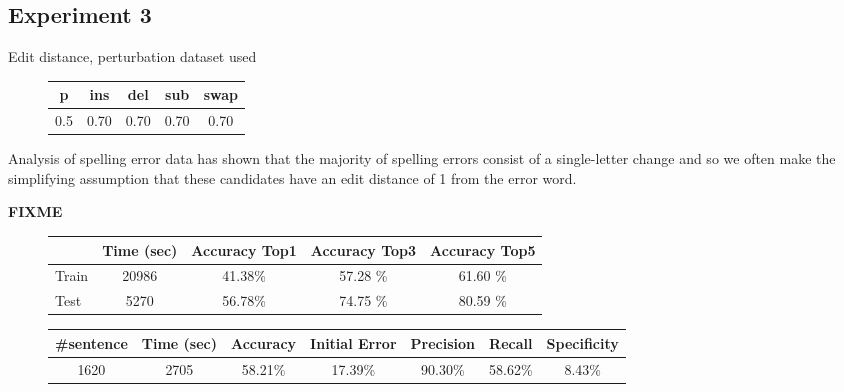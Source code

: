 \subsection{Experiment 3}

Edit distance, perturbation dataset used

\begin{figure}[H]
	\centering
	\begin{tabular}{ccccc}
		\toprule
		p 				 & ins 				 	& del  				&  sub 			   &   swap\\ \midrule
		\num{0.5} & \num{0,70} & \num{0,70}  & \num{0,70} & \num{0,70}\\
		\bottomrule
	\end{tabular}
	\label{tab:error_model3}
\end{figure}

Analysis of spelling error data has shown that the majority of spelling errors consist of a single-letter change and 
so we often make the simplifying assumption that these candidates have an edit distance of 1 from the error word.

\textbf{FIXME}
\begin{figure}[H]
	\centering
	\begin{tabular}{lcccc}
		\toprule
		& Time (sec)  & Accuracy Top1 & Accuracy Top3  &  Accuracy Top5 \\
		\midrule
		Train & \num{20986} & \num{41,38}\%  & \num{57,28} \% & \num{61,60} \% \\
		Test &	\num{5270}  & \num{56,78}\%  & \num{74,75} \% & \num{80,59} \%  \\
		\bottomrule
	\end{tabular}
	\label{tab:typo-eval3}
\end{figure}


\begin{figure}[H]
	\centering
	\begin{tabular}{ccccccc}
		\toprule
		\#sentence & Time (sec)  & Accuracy & Initial Error  &  Precision & Recall & Specificity \\
		\midrule
		\num{1620}	& \num{2705}  & \num{58,21}\%  & \num{17,39}\% & \num{90,30}\% & \num{58,62}\%  & 
		\num{8,43}\%  
		\\
		\bottomrule
	\end{tabular}
	\label{tab:sentence-eval3}
\end{figure}